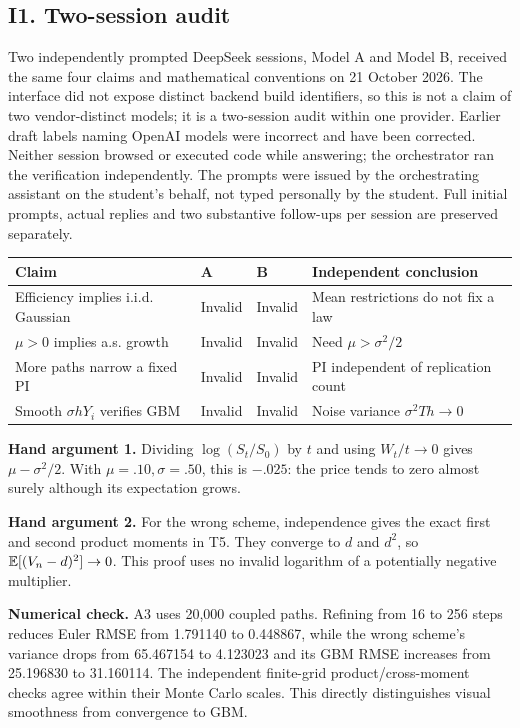 \subsection{I1. Two-session audit}
Two independently prompted DeepSeek sessions, Model A and Model B, received the same four claims and mathematical conventions on 21 October 2026. The interface did not expose distinct backend build identifiers, so this is not a claim of two vendor-distinct models; it is a two-session audit within one provider. Earlier draft labels naming OpenAI models were incorrect and have been corrected. Neither session browsed or executed code while answering; the orchestrator ran the verification independently. The prompts were issued by the orchestrating assistant on the student's behalf, not typed personally by the student. Full initial prompts, actual replies and two substantive follow-ups per session are preserved separately.
\begin{center}
\begin{tabular}{p{.30\linewidth}lll}
\toprule
Claim & A & B & Independent conclusion\\\midrule
Efficiency implies i.i.d. Gaussian & Invalid & Invalid & Mean restrictions do not fix a law\\
$\mu>0$ implies a.s. growth & Invalid & Invalid & Need $\mu>\sigma^2/2$\\
More paths narrow a fixed PI & Invalid & Invalid & PI independent of replication count\\
Smooth $\sigma hY_i$ verifies GBM & Invalid & Invalid & Noise variance $\sigma^2Th\to0$\\
\bottomrule
\end{tabular}
\end{center}

\textbf{Hand argument 1.} Dividing $\log(S_t/S_0)$ by $t$ and using $W_t/t\to0$ gives $\mu-\sigma^2/2$. With $\mu=.10,\sigma=.50$, this is $-.025$: the price tends to zero almost surely although its expectation grows.

\textbf{Hand argument 2.} For the wrong scheme, independence gives the exact first and second product moments in T5. They converge to $d$ and $d^2$, so $\mathbb E[(V_n-d)^2]\to0$. This proof uses no invalid logarithm of a potentially negative multiplier.

\textbf{Numerical check.} A3 uses 20,000 coupled paths. Refining from 16 to 256 steps reduces Euler RMSE from 1.791140 to 0.448867, while the wrong scheme's variance drops from 65.467154 to 4.123023 and its GBM RMSE increases from 25.196830 to 31.160114. The independent finite-grid product/cross-moment checks agree within their Monte Carlo scales. This directly distinguishes visual smoothness from convergence to GBM.

